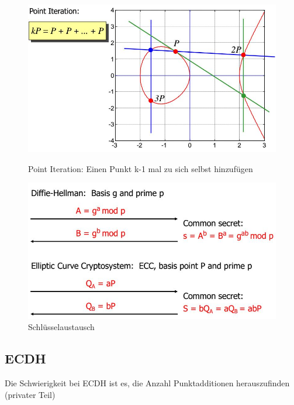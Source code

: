 \begin{figure}[ht!]
	\centering
	\begin{minipage}[t]{0.4\textwidth}
		\centering
		\includegraphics[width=\linewidth]{images/eliptic_curve_calculation_point_iteration}
		\caption{Point Iteration: Einen Punkt k-1 mal zu sich selbst hinzufügen}
		\label{fig:elipticcurvecalculationpointiteration}
	\end{minipage}
	\begin{minipage}[t]{0.4\textwidth}
		\centering
		\includegraphics[width=\linewidth]{images/eliptic_curve_key_exchange}
		\caption{Schlüsselaustausch}
		\label{fig:elipticcurvekeyexchange}
	\end{minipage}
\end{figure}

\newpage
\subsection{ECDH}
Die Schwierigkeit bei ECDH ist es, die Anzahl Punktadditionen herauszufinden (privater Teil)

